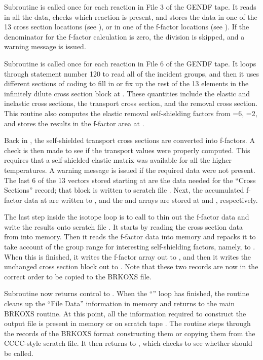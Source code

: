 Subroutine  is called
once for each reaction in File 3 of the GENDF tape.  It reads in
all the data, checks which reaction is present, and stores the data
in one of the 13 cross section locations (see ), or
in one of the f-factor locations (see ).  If the
denominator for the f-factor calculation is zero, the division
is skipped, and a warning message is issued.

Subroutine  is  called
once for each reaction in File 6 of the GENDF tape.  It loops
through statement number 120 to read all of the incident groups,
and then it uses different sections of coding to  fill in
or fix up the rest of the 13 elements in the infinitely dilute
cross section block at .  These quantities include the
elastic and inelastic cross sections, the transport cross section, and
the removal cross section.  This routine also computes the elastic
removal self-shielding factors from =6, =2, and stores
the results in the f-factor area at .

Back in , the self-shielded transport cross sections are
converted into f-factors.  A check is then made to see if the transport
values were properly computed.  This requires that a self-shielded
elastic matrix was available for all the higher temperatures.  A
warning message is issued if the required data were not present.  The
last 6 of the 13 vectors stored starting at  are the data
needed for the ``Cross Sections'' record; that block is written to
scratch file .  Next, the accumulated f-factor data at
 are written to , and the  and
 arrays are stored at  and ,
respectively.

The last step inside the isotope loop is to call
 to thin
out the f-factor data and write the results onto scratch file
.  It starts by reading the cross section data from
 into memory. Then it reads the f-factor data into memory
and repacks it to take account of the group range for interesting
self-shielding factors, namely,  to .  When this
is finished, it writes the f-factor array out to , and
then it writes the unchanged cross section block out to .
Note that these two records are now in the correct order to be copied
to the BRKOXS file.

Subroutine  now returns control to .
When the ``'' loop has finished, the routine cleans
up the ``File Data'' information in memory and returns to the
main BRKOXS routine.  At this point, all the information required
to construct the output file is present in memory or on scratch
tape .  The routine steps through the records of the
BRKOXS format constructing them or copying them from the CCCC-style
scratch file.  It then returns to , which checks to
see whether  should be called.

